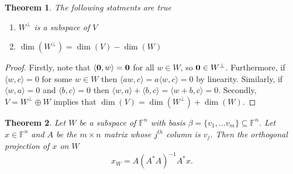 \documentclass[oneside, 12pt]{book}
\newtheorem{thm}{Theorem}[section]
\theoremstyle{definition}
\begin{document}
\begin{thm}
The following statments are true
\begin{enumerate}
  \item $W^{\perp}$ is a subspace of $V$
  \item $\dim(W^{\perp})=\dim(V)-\dim(W)$
\end{enumerate}
\end{thm}
\begin{proof}
  Firstly, note that $ \langle \bold{0}, w\rangle=\bold{0}$ for all $w \in W$, so $\bold{0} \in W^{\perp}$. Furthermore, if $\langle w, c\rangle=0$ for some $w \in W$ then
  $\langle aw, c \rangle = a \langle w, c \rangle =0 $ by linearity. Similarly, if $\langle w, a \rangle=0  $ and $\langle b, c \rangle=0  $ then $\langle w, a \rangle+ \langle b, c \rangle= \langle w+b, c \rangle =0$. Secondly, $V= W^{\perp} \oplus W$ implies that $\dim(V)=\dim(W^{\perp})+\dim(W)$.
\end{proof}

\begin{thm}
Let $W$ be a subspace of $\mathbb{F}^{n}$ with basis $\beta=\{v_{1}, \dots v_{m}\} \subseteq \mathbb{F}^{n}$. Let $x \in \mathbb{F}^{n}$ and $A$ be the $m \times n$ matrix  whose $j^{th}$ column is $v_{j}$. Then the orthogonal projection of $x$ on $W$ \[x_{W}=A(A^{*}A)^{-1}A^{*}x.\]
\end{thm}
\end{document}
